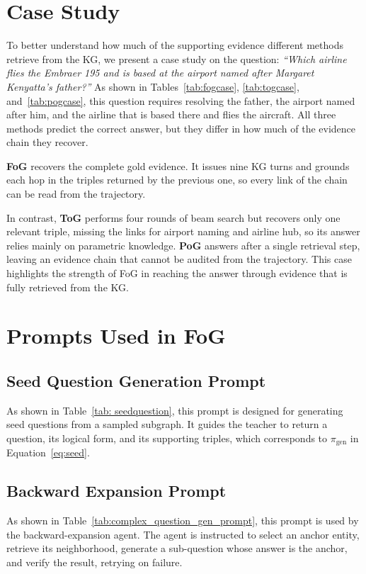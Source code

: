 


\section{Case Study}
\label{app:casestudy}
To better understand how much of the supporting evidence different methods retrieve from the KG, we present a case study on the question: \textit{``Which airline flies the Embraer 195 and is based at the airport named after Margaret Kenyatta's father?''} As shown in Tables~\ref{tab:fogcase}, \ref{tab:togcase}, and~\ref{tab:pogcase}, this question requires resolving the father, the airport named after him, and the airline that is based there and flies the aircraft. All three methods predict the correct answer, but they differ in how much of the evidence chain they recover.

\textbf{FoG} recovers the complete gold evidence. It issues nine KG turns and grounds each hop in the triples returned by the previous one, so every link of the chain can be read from the trajectory.

In contrast, \textbf{ToG} performs four rounds of beam search but recovers only one relevant triple, missing the links for airport naming and airline hub, so its answer relies mainly on parametric knowledge. \textbf{PoG} answers after a single retrieval step, leaving an evidence chain that cannot be audited from the trajectory. This case highlights the strength of FoG in reaching the answer through evidence that is fully retrieved from the KG.





\section{Prompts Used in FoG}
\label{app:prompts}

\subsection{Seed Question Generation Prompt}
As shown in Table~\ref{tab: seedquestion}, this prompt is designed for generating seed questions from a sampled subgraph. It guides the teacher to return a question, its logical form, and its supporting triples, which corresponds to $\pi_{\text{gen}}$ in Equation~\ref{eq:seed}.

\subsection{Backward Expansion Prompt}
As shown in Table~\ref{tab:complex_question_gen_prompt}, this prompt is used by the backward-expansion agent. The agent is instructed to select an anchor entity, retrieve its neighborhood, generate a sub-question whose answer is the anchor, and verify the result, retrying on failure.

